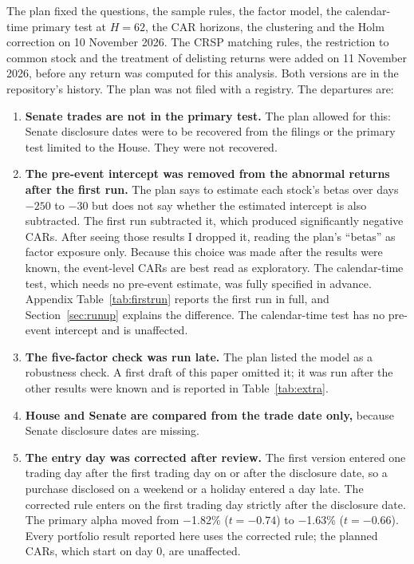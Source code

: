 \documentclass[11pt]{article}
\newcommand{\m}{\ensuremath{-}}
\begin{document}
The plan fixed the questions, the sample rules, the factor model, the calendar-time primary test at $H = 62$, the CAR horizons, the clustering and the Holm correction on 10 November 2026. The CRSP matching rules, the restriction to common stock and the treatment of delisting returns were added on 11 November 2026, before any return was computed for this analysis. Both versions are in the repository's history. The plan was not filed with a registry. The departures are:
\begin{enumerate}
\item \textbf{Senate trades are not in the primary test.} The plan allowed for this: Senate disclosure dates were to be recovered from the filings or the primary test limited to the House. They were not recovered.
\item \textbf{The pre-event intercept was removed from the abnormal returns after the first run.} The plan says to estimate each stock's betas over days $-250$ to $-30$ but does not say whether the estimated intercept is also subtracted. The first run subtracted it, which produced significantly negative CARs. After seeing those results I dropped it, reading the plan's ``betas'' as factor exposure only. Because this choice was made after the results were known, the event-level CARs are best read as exploratory. The calendar-time test, which needs no pre-event estimate, was fully specified in advance. Appendix Table~\ref{tab:firstrun} reports the first run in full, and Section~\ref{sec:runup} explains the difference. The calendar-time test has no pre-event intercept and is unaffected.
\item \textbf{The five-factor check was run late.} The plan listed the \citet{fama2015five} model as a robustness check. A first draft of this paper omitted it; it was run after the other results were known and is reported in Table~\ref{tab:extra}.
\item \textbf{House and Senate are compared from the trade date only,} because Senate disclosure dates are missing.
\item \textbf{The entry day was corrected after review.} The first version entered one trading day after the first trading day on or after the disclosure date, so a purchase disclosed on a weekend or a holiday entered a day late. The corrected rule enters on the first trading day strictly after the disclosure date. The primary alpha moved from \m1.82\% ($t = \m0.74$) to \m1.63\% ($t = \m0.66$). Every portfolio result reported here uses the corrected rule; the planned CARs, which start on day 0, are unaffected.

\end{enumerate}
\end{document}
